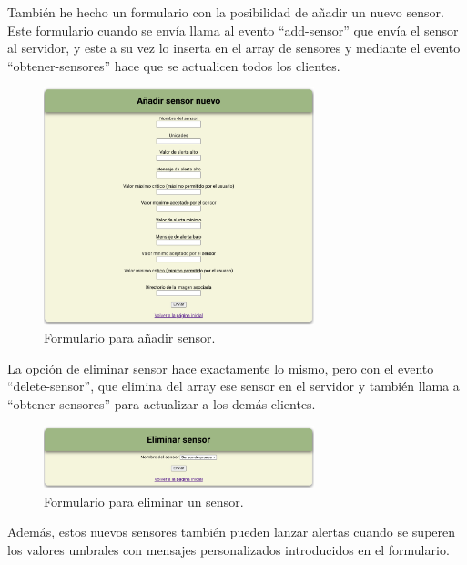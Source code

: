 \documentclass{article}
\begin{document}
\newpage

También he hecho un formulario con la posibilidad de añadir un nuevo sensor. Este formulario cuando se envía llama al evento ``add-sensor'' que envía el sensor al servidor, y este a su vez lo inserta en el array de sensores y mediante el evento ``obtener-sensores'' hace que se actualicen todos los clientes. 

\begin{figure}[H]
    \centering
    \includegraphics[width=0.7\textwidth]{images/addsensor.png}
    \caption{Formulario para añadir sensor.}
\end{figure}

La opción de eliminar sensor hace exactamente lo mismo, pero con el evento ``delete-sensor'', que elimina del array ese sensor en el servidor y también llama a ``obtener-sensores'' para actualizar a los demás clientes.

\begin{figure}[H]
    \centering
    \includegraphics[width=0.7\textwidth]{images/deletesensorform.png}
    \caption{Formulario para eliminar un sensor.}
\end{figure}

\newpage

Además, estos nuevos sensores también pueden lanzar alertas cuando se superen los valores umbrales con mensajes personalizados introducidos en el formulario.
\end{document}

